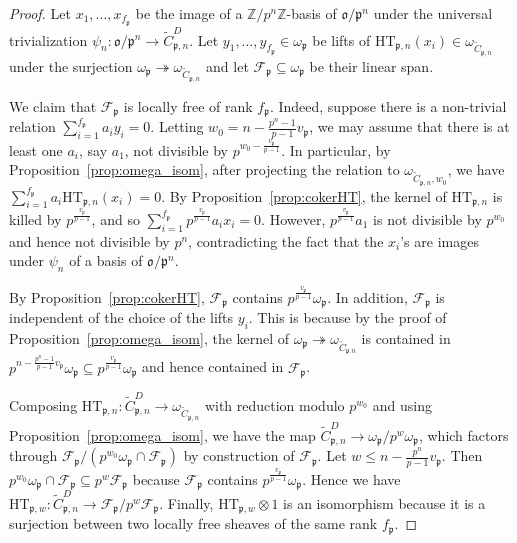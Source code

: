 \documentclass[11pt]{amsart}
\theoremstyle{definition} %
\theoremstyle{plain} %
\theoremstyle{remark} %
\newcommand{\ZZ}{{\mathbb Z}}
\newcommand{\cF}{{\mathcal F}}
\newcommand{\frako}{\mathfrak o}
\newcommand{\frakp}{\mathfrak p}
\newcommand{\HT}{\mathrm{HT}}
\begin{document}
\begin{proof} Let  $x_1,\ldots, x_{f_{\frakp}}$ be the image of a $\ZZ/p^n\ZZ$-basis of $\frako/\frakp^n$ 
under the universal trivialization $\psi_n\colon \frako/\frakp^n \rightarrow \widetilde{C}_{\frakp,n}^{D}$.
Let $y_1,\ldots, y_{f_\frakp}\in\omega_\frakp$ be lifts of $\HT_{\frakp,n}(x_i)\in \omega_{\widetilde{C}_{\frakp,n}}$ under the surjection $\omega_\frakp\twoheadrightarrow \omega_{\widetilde{C}_{\frakp,n}}$ and let $\cF_\frakp\subseteq \omega_\frakp$ be their linear span. 

We claim that $\cF_\frakp$ is locally free of rank $f_\frakp$. 
Indeed, suppose there is a non-trivial relation $\sum_{i=1}^{f_\frakp} a_i y_i = 0$.
Letting $w_0=n-\frac{p^n-1}{p-1}v_\frakp$, we may assume that there is at least one $a_i$, say $a_1$, not divisible by $p^{w_0-\frac{v_\frakp}{p-1}}$.
In particular, by Proposition~\ref{prop:omega_isom}, after projecting the relation to $\omega_{\widetilde{C}_{\frakp,n},w_0}$, we have $\sum_{i=1}^{f_\frakp} a_i \HT_{\frakp,n}(x_i) = 0$.
By Proposition~\ref{prop:cokerHT}, the kernel of $\HT_{\frakp,n}$ is killed by $p^{\frac{v_\frakp}{p-1}}$, and so $\sum_{i=1}^{f_\frakp} p^{\frac{v_\frakp}{p-1}}a_i x_i=0$. 
However, $p^{\frac{v_\frakp}{p-1}}a_1$ is not divisible by $p^{w_0}$ and hence not divisible by $p^n$, contradicting the fact that the $x_i$'s are images under $\psi_n$ of a basis of $\frako/\frakp^n$.

By Proposition~\ref{prop:cokerHT}, $\cF_\frakp$ contains $p^{\frac{v_\frakp}{p-1}}\omega_\frakp$.
In addition, $\cF_\frakp$ is independent of the choice of the lifts $y_i$.
This is because by the proof of Proposition~\ref{prop:omega_isom}, the kernel of $\omega_\frakp\twoheadrightarrow \omega_{\widetilde{C}_{\frakp.n}}$ is contained in $p^{n-\frac{p^n-1}{p-1}v_\frakp}\omega_\frakp\subseteq p^{\frac{v_\frakp}{p-1}}\omega_\frakp$ and hence contained in $\cF_\frakp$.

Composing $\HT_{\frakp,n}\colon \widetilde{C}_{\frakp,n}^{D} \rightarrow \omega_{\widetilde{C}_{\frakp,n}}$ with reduction modulo $p^{w_0}$ and using Proposition~\ref{prop:omega_isom}, we have the map $\widetilde{C}_{\frakp,n}^{D} \rightarrow \omega_{\frakp}/p^w\omega_\frakp$, which factors through $\cF_\frakp/(p^{w_0}\omega_\frakp \cap \cF_\frakp)$ by construction of $\cF_\frakp$.
Let $w\leqslant n-\frac{p^n}{p-1}v_\frakp$.
Then $p^{w_0}\omega_\frakp \cap \cF_\frakp \subseteq p^w \cF_\frakp$ because $\cF_\frakp$ contains $p^{\frac{v_\frakp}{p-1}}\omega_\frakp$.
Hence we have $\HT_{\frakp,w}\colon \widetilde{C}_{\frakp,n}^{D} \rightarrow \cF_{\frakp}/p^w \cF_{\frakp}$.
Finally, $\HT_{\frakp,w}\otimes 1$ is an isomorphism because it is a surjection between two locally free sheaves of the same rank $f_\frakp$.\end{proof}
\end{document}
